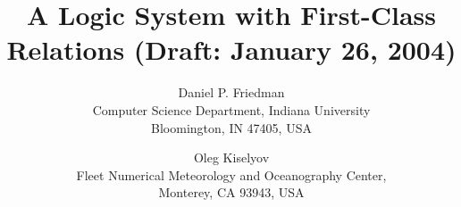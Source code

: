\RequirePackage{alltt}


\newcommand{\comment}[1]{}
\newcommand{\mirror}{\mathop{\mathrm{mirror}}}
\newcommand{\suitable}{\mathop{\mathrm{suitable}}}

\def\endofexercise{{~\ $\Diamond$}}
\def\myrule{\raisebox{3.4ex}[1.5ex][.75ex]{\rule{126mm}{.01mm}}{\vspace{-3ex}}\\}
\def\codefontsize{\fontsize{9}{10}\selectfont\tt}
\def\inlinecode#1{\hbox{\codefontsize #1\/}}
\long\def\inlinecodebreak#1{{\codefontsize #1\/}}
\newenvironment{verbatimcode}%
  {\endgraf\codefontsize\verbatim}%
  {\endverbatim}
\newenvironment{ttcode}
  {\codefontsize\begin{alltt}}
  {\end{alltt}}
\def\Di{$D_i$}
\def\Ds{$D_s$}
\newcommand{\Rule}[4]{
\makebox{{\rm #1}
$\displaystyle
\frac{\begin{array}{l}#2\\\end{array}}
{\begin{array}{l}#3\\\end{array}}$
 #4}}





\title[Tutorial]{A Logic System with First-Class Relations
(Draft: January 26, 2004)} \author[Friedman, Kiselyov]
{Daniel P. Friedman
\\ Computer Science Department, Indiana University
\\ Bloomington, IN 47405, USA
\and Oleg Kiselyov
\\ Fleet Numerical Meteorology and Oceanography Center,
\\ Monterey, CA 93943, USA
}
\maketitle

